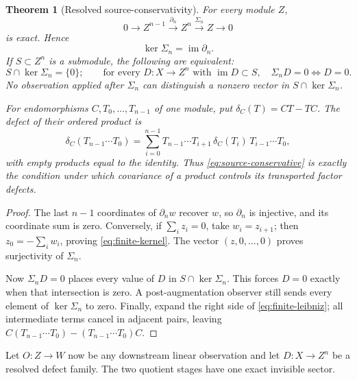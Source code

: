 \documentclass[11pt]{article}
\newtheorem{theorem}{Theorem}[section]
\theoremstyle{definition}
\theoremstyle{remark}
\newcommand{\im}{\operatorname{im}}
\begin{document}
\begin{theorem}[Resolved source-conservativity]
\label{thm:augmentation-conservativity}
For every module \(Z\),
\[
0\longrightarrow Z^{n-1}\xrightarrow{\partial_n}Z^n
 \xrightarrow{\Sigma_n}Z\longrightarrow0
\tag{2.12c}\label{eq:finite-exact}
\]
is exact.  Hence
\[
                 \ker\Sigma_n=\im\partial_n.
\tag{2.12d}\label{eq:finite-kernel}
\]
If \(S\subset Z^n\) is a submodule, the following are equivalent:
\[
 S\cap\ker\Sigma_n=\{0\};
 \qquad
 \text{for every }D:X\to Z^n\text{ with }\im D\subset S,
 \quad \Sigma_nD=0\Longleftrightarrow D=0.
\tag{2.12e}\label{eq:source-conservative}
\]
No observation applied after \(\Sigma_n\) can
distinguish a nonzero vector in \(S\cap\ker\Sigma_n\).

For endomorphisms \(C,T_0,\ldots,T_{n-1}\) of one module, put
\(\delta_C(T)=CT-TC\).  The defect of their ordered product is
\[
 \delta_C(T_{n-1}\cdots T_0)
 =\sum_{i=0}^{n-1}
  T_{n-1}\cdots T_{i+1}\,\delta_C(T_i)\,
  T_{i-1}\cdots T_0,
\tag{2.12f}\label{eq:finite-leibniz}
\]
with empty products equal to the identity.  Thus
\eqref{eq:source-conservative} is exactly the condition under which
covariance of a product controls its transported factor defects.
\end{theorem}

\begin{proof}
The last \(n-1\) coordinates of \(\partial_n w\) recover \(w\), so
\(\partial_n\) is injective, and its coordinate sum is zero.  Conversely,
if \(\sum_i z_i=0\), take \(w_i=z_{i+1}\); then
\(z_0=-\sum_iw_i\), proving \eqref{eq:finite-kernel}.  The vector
\((z,0,\ldots,0)\) proves surjectivity of \(\Sigma_n\).

Now \(\Sigma_nD=0\) places every value of \(D\) in
\(S\cap\ker\Sigma_n\).  This forces \(D=0\) exactly when that intersection
is zero.  A post-augmentation observer still sends every element of
\(\ker\Sigma_n\) to zero.  Finally, expand the right side of
\eqref{eq:finite-leibniz}; all intermediate terms cancel in adjacent pairs,
leaving \(C(T_{n-1}\cdots T_0)-(T_{n-1}\cdots T_0)C\).
\end{proof}

Let \(O:Z\to W\) now be any downstream linear observation and let
\(D:X\to Z^n\) be a resolved defect family.  The two quotient stages have
one exact invisible sector.
\end{document}
